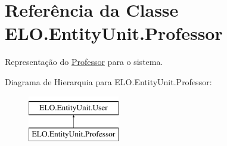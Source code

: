 \hypertarget{classELO_1_1EntityUnit_1_1Professor}{\section{Referência da Classe E\-L\-O.\-Entity\-Unit.\-Professor}
\label{d5/df1/classELO_1_1EntityUnit_1_1Professor}
}


Representação do \hyperlink{classELO_1_1EntityUnit_1_1Professor}{Professor} para o sistema.  


Diagrama de Hierarquia para E\-L\-O.\-Entity\-Unit.\-Professor\-:\begin{figure}[H]
\begin{center}
\leavevmode
\includegraphics[height=2.000000cm]{d5/df1/classELO_1_1EntityUnit_1_1Professor}
\end{center}
\end{figure}
